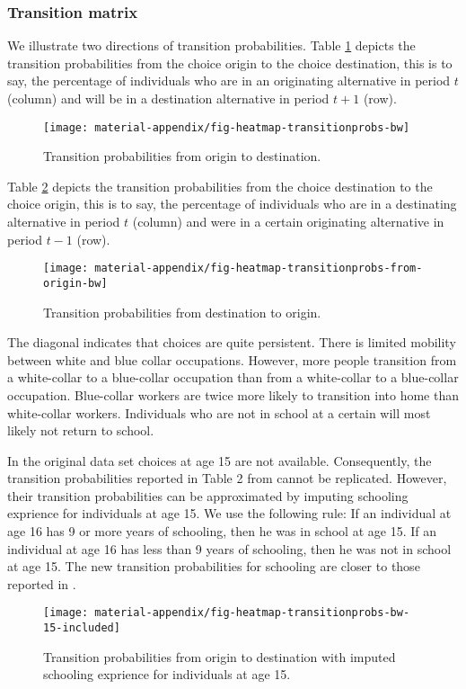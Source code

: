 \subsubsection*{Transition matrix}
We illustrate two directions of transition probabilities. Table \ref{fig:TransitionProbabilitiesOriginToDestination} depicts the transition probabilities from the choice origin to the choice destination, this is to say, the percentage of individuals who are in an originating alternative in period $t$ (column) and will be in a destination alternative in period $t+1$ (row).
\begin{figure}[h]\centering
\caption{Transition probabilities from origin to destination.}\label{fig:TransitionProbabilitiesOriginToDestination}
\texttt{[image: material-appendix/fig-heatmap-transitionprobs-bw]}
\end{figure}
%
Table \ref{fig:TransitionProbabilitiesDestinationToOrigin} depicts the transition probabilities from the choice destination to the choice origin, this is to say, the percentage of individuals who are in a destinating alternative in period $t$ (column) and were in a certain originating alternative in period $t-1$ (row).
\begin{figure}[h]\centering
\caption{Transition probabilities from destination to origin.}\label{fig:TransitionProbabilitiesDestinationToOrigin}
\texttt{[image: material-appendix/fig-heatmap-transitionprobs-from-origin-bw]}
\end{figure}
%
The diagonal indicates that choices are quite persistent. There is limited mobility between white and blue collar occupations. However, more people transition from a white-collar to a blue-collar occupation than from a white-collar to a blue-collar occupation. Blue-collar workers are twice more likely to transition into home than white-collar workers. Individuals who are not in school at a certain will most likely not return to school.


In the original data set choices at age 15 are not available. Consequently, the transition probabilities reported in Table 2 from \citet{Keane.1997} cannot be replicated. However, their transition probabilities can be approximated by imputing schooling exprience for individuals at age 15. We use the following rule: If an individual at age 16 has 9 or more years of schooling, then he was in school at age 15. If an individual at age 16 has less than 9 years of schooling, then he was not in school at age 15. The new transition probabilities for schooling are closer to those reported in \citet{Keane.1997}.
\begin{figure}[h]\centering
\caption{Transition probabilities from origin to destination with imputed schooling exprience for individuals at age 15.}\label{fig:TransitionProbabilitiesImputing}
\texttt{[image: material-appendix/fig-heatmap-transitionprobs-bw-15-included]}
\end{figure}
%

